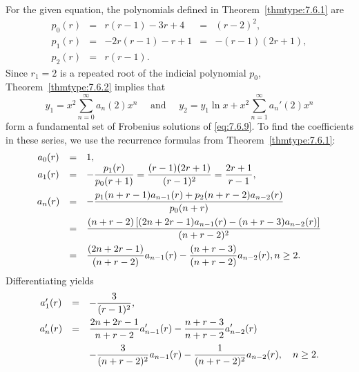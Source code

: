 \begin{examplesolution}
\solution For the given equation, the polynomials defined in Theorem~\ref{thmtype:7.6.1} are
\[
  \begin{array}{lllll}
    p_{0}(r) & = & r(r-1)-3r+4  & = & (r-2)^{2},    \\[5pt]
    p_{1}(r) & = & -2r(r-1)-r+1 & = & -(r-1)(2r+1), \\[5pt]
    p_{2}(r) & = & r(r-1).
  \end{array}
\]
Since $r_{1}=2$ is a repeated root of the indicial polynomial $p_{0}$, Theorem~\ref{thmtype:7.6.2}
implies that
\begin{equation}
  \label{eq:7.6.10}y_{1}=x^{2}\sum_{n=0}^{\infty}a_{n}(2)x^{n}\quad\mbox{ and }\quad y_{2}=y_{1}\ln x+x^{2}\sum_{n=1}^{\infty}a_{n}'(2)x^{n}
\end{equation}
form a fundamental set of Frobenius solutions of \eqref{eq:7.6.9}. To find the coefficients in these
series, we use the recurrence formulas from Theorem~\ref{thmtype:7.6.1}:
\begin{equation}
  \label{eq:7.6.11}
  \begin{array}{ccl}
    a_{0}(r) & = & 1,                                                                                          \\
    a_{1}(r) & = & -\displaystyle\frac{p_{1}(r)}{p_{0}(r+1)} =\displaystyle\frac{(r-1)(2r+1)}{(r-1)^{2}} =\displaystyle\frac{2r+1}{r-1}, \\[10pt]
    a_{n}(r) & = & -\displaystyle\frac{p_{1}(n+r-1)a_{n-1}(r)+p_{2}(n+r-2)a_{n-2}(r)}{p_{0}(n+r)}                       \\[10pt]
             & = & \displaystyle\frac{(n+r-2)\left[(2n+2r-1)a_{n-1}(r) -(n+r-3)a_{n-2}(r)\right]}{(n+r-2)^{2}}          \\[10pt]
             & = & \displaystyle{\frac{(2n+2r-1)}{(n+r-2)}a_{n-1}(r)- \frac{(n+r-3)}{(n+r-2)}a_{n-2}(r)},n\ge2.
  \end{array}
\end{equation}
Differentiating yields
\begin{equation}
  \label{eq:7.6.12}
  \begin{array}{ccl}
    a'_{1}(r) & = & -\displaystyle\frac{3}{(r-1)^{2}},                                                           \\[10pt]
    a'_{n}(r) & = & \displaystyle{\frac{2n+2r-1}{n+r-2}a'_{n-1}(r)-\frac{n+r-3}{n+r-2}a'_{n-2}(r)}               \\[10pt]
              &   & \displaystyle{-\frac{3}{(n+r-2)^{2}}a_{n-1}(r)-\frac{1}{(n+r-2)^{2}}a_{n-2}(r)},\quad n\ge2.
  \end{array}
\end{equation}


\end{examplesolution}
